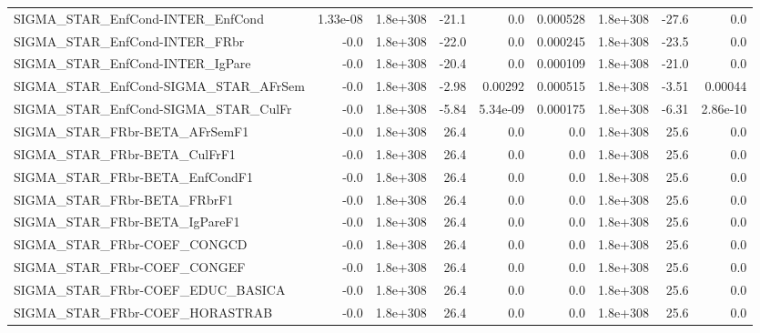 \begin{tabular}{lrrrrrrrr}
SIGMA\_STAR\_EnfCond-INTER\_EnfCond     &    1.33e-08 &     1.8e+308 &   -21.1 &      0.0 &   0.000528 &    1.8e+308 &        -27.6 &           0.0 \\
SIGMA\_STAR\_EnfCond-INTER\_FRbr        &        -0.0 &     1.8e+308 &   -22.0 &      0.0 &   0.000245 &    1.8e+308 &        -23.5 &           0.0 \\
SIGMA\_STAR\_EnfCond-INTER\_IgPare      &        -0.0 &     1.8e+308 &   -20.4 &      0.0 &   0.000109 &    1.8e+308 &        -21.0 &           0.0 \\
SIGMA\_STAR\_EnfCond-SIGMA\_STAR\_AFrSem &        -0.0 &     1.8e+308 &   -2.98 &  0.00292 &   0.000515 &    1.8e+308 &        -3.51 &       0.00044 \\
SIGMA\_STAR\_EnfCond-SIGMA\_STAR\_CulFr  &        -0.0 &     1.8e+308 &   -5.84 & 5.34e-09 &   0.000175 &    1.8e+308 &        -6.31 &      2.86e-10 \\
SIGMA\_STAR\_FRbr-BETA\_AFrSemF1        &        -0.0 &     1.8e+308 &    26.4 &      0.0 &        0.0 &    1.8e+308 &         25.6 &           0.0 \\
SIGMA\_STAR\_FRbr-BETA\_CulFrF1         &        -0.0 &     1.8e+308 &    26.4 &      0.0 &        0.0 &    1.8e+308 &         25.6 &           0.0 \\
SIGMA\_STAR\_FRbr-BETA\_EnfCondF1       &        -0.0 &     1.8e+308 &    26.4 &      0.0 &        0.0 &    1.8e+308 &         25.6 &           0.0 \\
SIGMA\_STAR\_FRbr-BETA\_FRbrF1          &        -0.0 &     1.8e+308 &    26.4 &      0.0 &        0.0 &    1.8e+308 &         25.6 &           0.0 \\
SIGMA\_STAR\_FRbr-BETA\_IgPareF1        &        -0.0 &     1.8e+308 &    26.4 &      0.0 &        0.0 &    1.8e+308 &         25.6 &           0.0 \\
SIGMA\_STAR\_FRbr-COEF\_CONGCD          &        -0.0 &     1.8e+308 &    26.4 &      0.0 &        0.0 &    1.8e+308 &         25.6 &           0.0 \\
SIGMA\_STAR\_FRbr-COEF\_CONGEF          &        -0.0 &     1.8e+308 &    26.4 &      0.0 &        0.0 &    1.8e+308 &         25.6 &           0.0 \\
SIGMA\_STAR\_FRbr-COEF\_EDUC\_BASICA     &        -0.0 &     1.8e+308 &    26.4 &      0.0 &        0.0 &    1.8e+308 &         25.6 &           0.0 \\
SIGMA\_STAR\_FRbr-COEF\_HORASTRAB       &        -0.0 &     1.8e+308 &    26.4 &      0.0 &        0.0 &    1.8e+308 &         25.6 &           0.0 \\

\end{tabular}

